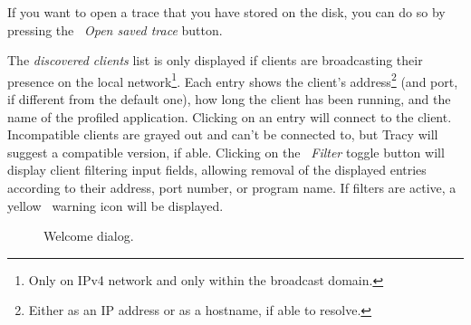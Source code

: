 \documentclass[hidelinks,titlepage,a4paper,twoside]{article}
\begin{document}
If you want to open a trace that you have stored on the disk, you can do so by pressing the \faFolderOpen{}~\emph{Open saved trace} button.

The \emph{discovered clients} list is only displayed if clients are broadcasting their presence on the local network\footnote{Only on IPv4 network and only within the broadcast domain.}. Each entry shows the client's address\footnote{Either as an IP address or as a hostname, if able to resolve.} (and port, if different from the default one), how long the client has been running, and the name of the profiled application. Clicking on an entry will connect to the client. Incompatible clients are grayed out and can't be connected to, but Tracy will suggest a compatible version, if able. Clicking on the \emph{\faFilter{}~Filter} toggle button will display client filtering input fields, allowing removal of the displayed entries according to their address, port number, or program name. If filters are active, a yellow \faTriangleExclamation{}~warning icon will be displayed.

\begin{figure}[h]
\centering{}
\caption{Welcome dialog.}
\label{welcomedialog}
\end{figure}
\end{document}
